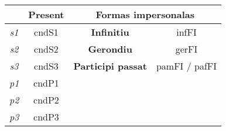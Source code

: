 \documentclass[10pt,a4paper,final]{article}
\begin{document}
\begin{tabular}{|c|c|c|c|c|}
\hline 
 &  \multicolumn{2}{c|}{\textbf{Present}} & \multicolumn{2}{c|}{\textbf{Formas impersonalas}}  \\ 
\hline 
\textit{s1} & \multicolumn{2}{c|}{cndS1}  & \textbf{Infinitiu} & infFI \\ 
\hline 
\textit{s2} & \multicolumn{2}{c|}{cndS2}  & \textbf{Gerondiu} & gerFI \\ 
\hline 
\textit{s3} & \multicolumn{2}{c|}{cndS3}  & \textbf{Participi passat} & pamFI / pafFI \\ 
\hline 
\textit{p1} & \multicolumn{2}{c|}{cndP1} & \multicolumn{2}{c|}{} \\ 
\hline 
\textit{p2} & \multicolumn{2}{c|}{cndP2} & \multicolumn{2}{c|}{} \\ 
\hline 
\textit{p3} & \multicolumn{2}{c|}{cndP3} & \multicolumn{2}{c|}{} \\ 
\hline 
\end{tabular} 
\end{document}
